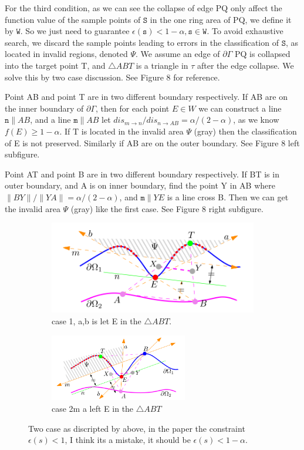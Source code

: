 \documentclass{article}
\theoremstyle{definition}
\theoremstyle{remark}
\begin{document}
\par For the third condition, as we can see the collapse of edge PQ only affect the function value of the sample points of $\mathtt{S}$ in the one ring area of PQ, we define it by $\mathtt{W}$. So we just need to guarantee $\epsilon(\mathtt{s}) < 1-\alpha,  \mathtt{s \in W}$. To avoid exhaustive search, we discard the sample points leading to errors in the classification of $\mathtt{S}$, as located in invalid regions, denoted $\Psi$. We assume an edge of $\partial \Gamma$ PQ is collapsed into the target point T, and $\bigtriangleup ABT$ is a triangle in $\tau$ after the edge collapse. We solve this by two case discussion. See Figure 8 for reference.
\par Point AB and  point T  are in two different boundary respectively. If AB are on the inner boundary of $\partial \Gamma$, then for each point $E \in W$ we can construct a line $\mathtt{n} \parallel AB$, and a line $\mathtt{m} \parallel AB$ let $dis_{m \to n}/dis_{n \to AB} = \alpha/(2-\alpha)$, as we know $f(E) \ge 1-\alpha$. If T is located in the invalid area $\Psi$ (gray) then the classification of E is not preserved.  Similarly if AB are on the outer boundary. See Figure 8 left subfigure.
\par Point AT and point B are in two different boundary respectively. If BT is in outer boundary, and A is on inner boundary, find the point Y in AB where $\parallel BY \parallel / \parallel YA \parallel = \alpha/(2-\alpha)$, and $\mathtt{m} \parallel YE$ is a line cross B. Then we can get the invalid area $\Psi$ (gray) like the first case. See Figure 8 right subfigure.
\begin{figure}[H]
  \begin{subfigure}[b]{0.5\textwidth}
 	\includegraphics[width=\textwidth]{8}
        \caption[case 1]{case 1, a,b is let E in the $\bigtriangleup ABT$.}
  \end{subfigure}
  \begin{subfigure}[b]{0.5\textwidth}
      	\includegraphics[width=6cm]{9}
        \caption[case 2]{case 2m a left E in the $\bigtriangleup ABT$}
   \end{subfigure}
  \caption[Edge Collapse] {Two case as discripted by above, in the paper the constraint $\epsilon(s) < 1$, I think its a mistake, it should be $\epsilon(s) <1-\alpha$.}
\end{figure}
\end{document}
